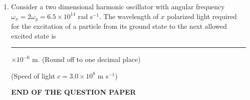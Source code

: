 \documentclass[journal,12pt,onecolumn]{IEEEtran}
\theoremstyle{remark}
\begin{document}
\begin{enumerate}
\item Consider a two dimensional harmonic oscillator with angular frequency \(\omega_x = 2\omega_y = 6.5 \times 10^{14}\) rad s\(^{-1}\). The wavelength of \(x\) polarized light required for the excitation of a particle from its ground state to the next allowed excited state is \rule{2cm}{0.15mm} \(\times 10^{-6}\) m. (Round off to one decimal place)

(Speed of light \(c = 3.0 \times 10^{8}\) m s\(^{-1}\))

\bigskip

\begin{center}
\textbf{END OF THE QUESTION PAPER}
\end{center}











  
\end{enumerate}
\end{document}

